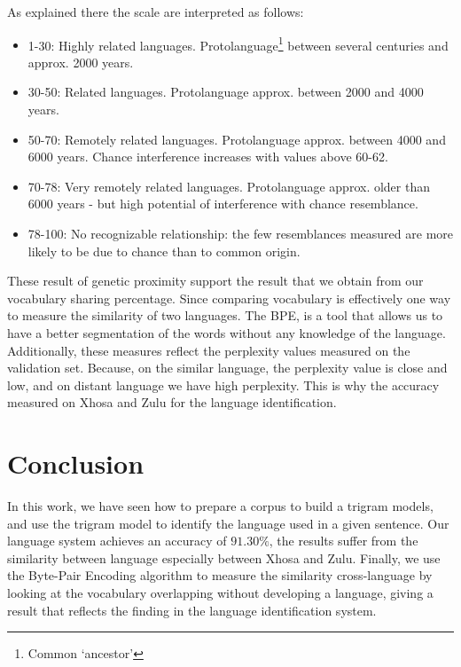 As explained there the scale are interpreted as follows:
\begin{itemize}
\item 1-30: Highly related languages. Protolanguage\footnote{Common `ancestor'} between several centuries and approx. 2000 years.
\item 30-50: Related languages. Protolanguage approx. between 2000 and 4000 years.
\item 50-70: Remotely related languages. Protolanguage approx. between 4000 and 6000 years. Chance interference increases with values above 60-62.
\item 70-78: Very remotely related languages. Protolanguage approx. older than 6000 years - but high potential of interference with chance resemblance.
\item 78-100: No recognizable relationship: the few resemblances measured are more likely to be due to chance than to common origin.
\end{itemize}

These result of genetic proximity support the result that we obtain from our vocabulary sharing percentage. Since comparing vocabulary  is effectively one way to measure the similarity of two languages. The BPE, is a tool that allows us to have a better segmentation of the words without any knowledge of the language. Additionally, these measures reflect the perplexity values measured on the validation set. Because, on the similar language, the perplexity value is close and low, and on distant language we have high perplexity. This is why the accuracy measured on Xhosa and Zulu for the language identification.


\section{Conclusion}
In this work, we have seen how to prepare a corpus to build a trigram models, and use the trigram model to identify the language used in a given sentence. Our language system achieves an accuracy of $91.30\%$, the results suffer from the similarity between language especially between Xhosa and Zulu. Finally, we use the Byte-Pair Encoding algorithm to measure the similarity cross-language by looking at the vocabulary overlapping without developing a language, giving a result that reflects the finding in the language identification system.
